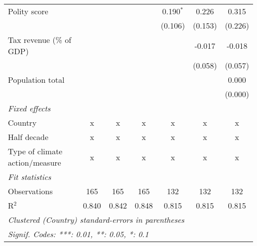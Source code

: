 \begin{tabular}{lcccccc}
   Polity score                                             &               &               &                & 0.190$^{*}$    & 0.226          & 0.315\\   
                                                            &               &               &                & (0.106)        & (0.153)        & (0.226)\\   
   Tax revenue (\% of GDP)                                  &               &               &                &                & -0.017         & -0.018\\   
                                                            &               &               &                &                & (0.058)        & (0.057)\\   
   Population total                                         &               &               &                &                &                & 0.000\\   
                                                            &               &               &                &                &                & (0.000)\\   
   \emph{Fixed effects}\\
   Country                                                  & x             & x             & x              & x              & x              & x\\  
   Half decade                                              & x             & x             & x              & x              & x              & x\\  
   Type of climate action/measure                           & x             & x             & x              & x              & x              & x\\  
   \midrule \emph{Fit statistics}\\
   Observations                                             & 165           & 165           & 165            & 132            & 132            & 132\\  
   R$^2$                                                    & 0.840         & 0.842         & 0.848          & 0.815          & 0.815          & 0.815\\  
   \midrule
   \multicolumn{7}{l}{\emph{Clustered (Country) standard-errors in parentheses}}\\
   \multicolumn{7}{l}{\emph{Signif. Codes: ***: 0.01, **: 0.05, *: 0.1}}\\
\end{tabular}
\par\endgroup


